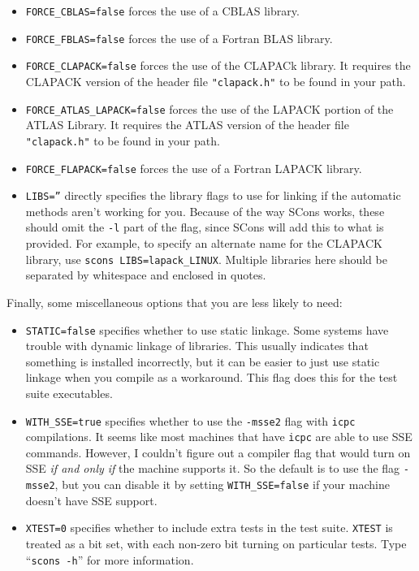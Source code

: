 \documentclass[twoside,letterpaper,11pt]{article}
\renewcommand{\tt}[1]{{\lstinline {#1}}}
\begin{document}
\begin{enumerate}
\begin{itemize}
\item \texttt{FORCE\_CBLAS=false} forces the use of a CBLAS library.
\item \texttt{FORCE\_FBLAS=false} forces the use of a Fortran BLAS library.
\item \texttt{FORCE\_CLAPACK=false} forces the use of the CLAPACk library. 
It requires the CLAPACK version of the header file \texttt{"clapack.h"} to be found in your path.
\item \texttt{FORCE\_ATLAS\_LAPACK=false} forces the use of the LAPACK portion
of the ATLAS Library.  
It requires the ATLAS version of the header file \texttt{"clapack.h"} to be found in your path.
\item \texttt{FORCE\_FLAPACK=false} forces the use of a Fortran LAPACK library.
\item \texttt{LIBS=''} directly specifies the library flags to use for linking if the automatic methods aren't working for you.  Because of the way SCons works,
these should omit the \texttt{-l} part of the flag, since SCons will add this to what is provided.
For example, to specify an alternate name for the CLAPACK library, use 
\texttt{scons LIBS=lapack\_LINUX}.  Multiple libraries here should be separated by 
whitespace and enclosed in quotes.
\end{itemize}
Finally, some miscellaneous options that you are less likely to need:
\begin{itemize}
\item \texttt{STATIC=false} specifies whether to use static linkage.  Some systems have trouble with
dynamic linkage of libraries.  This usually indicates that something is installed incorrectly, but
it can be easier to just use static linkage when you compile as a workaround.  This flag does this
for the test suite executables.
\item \texttt{WITH\_SSE=true} specifies whether to use the \texttt{-msse2} flag with \texttt{icpc} compilations. 
It seems like most machines that have \texttt{icpc} are able to use SSE commands.  However, 
I couldn't figure out a compiler flag that would turn on SSE {\em if and only if} the machine
supports it.  So the default is to use the flag \texttt{-msse2}, but you can disable it by setting 
\texttt{WITH\_SSE=false} if your machine doesn't have SSE support.
\item \texttt{XTEST=0} specifies whether to include extra tests in the test suite.  \texttt{XTEST}
is treated as a bit set, with each non-zero bit turning on particular tests.  Type ``\tt{scons -h}'' for 
more information.


\end{itemize}
\end{enumerate}
\end{document}
